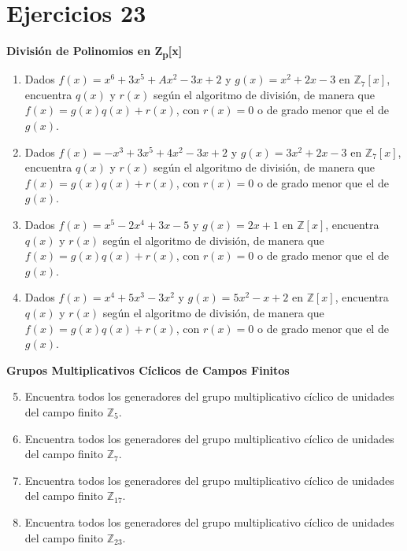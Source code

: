 \section*{Ejercicios 23}

\textbf{División de Polinomios en Z\textsubscript{p}[x]}
	
\begin{enumerate}
	\item Dados \(f(x) = x^6 + 3x^5 + Ax^2 - 3x + 2\) y \(g(x) = x^2 + 2x - 3\) en \(\mathbb{Z}_7[x]\), encuentra \(q(x)\) y \(r(x)\) según el algoritmo de división, de manera que \(f(x) = g(x)q(x) + r(x)\), con \(r(x) = 0\) o de grado menor que el de \(g(x)\).
		
	\item Dados \(f(x) = -x^3 + 3x^5 + 4x^2 - 3x + 2\) y \(g(x) = 3x^2 + 2x - 3\) en \(\mathbb{Z}_7[x]\), encuentra \(q(x)\) y \(r(x)\) según el algoritmo de división, de manera que \(f(x) = g(x)q(x) + r(x)\), con \(r(x) = 0\) o de grado menor que el de \(g(x)\).
		
	\item Dados \(f(x) = x^5 - 2x^4 + 3x - 5\) y \(g(x) = 2x + 1\) en \(\mathbb{Z}[x]\), encuentra \(q(x)\) y \(r(x)\) según el algoritmo de división, de manera que \(f(x) = g(x)q(x) + r(x)\), con \(r(x) = 0\) o de grado menor que el de \(g(x)\).
		
	\item Dados \(f(x) = x^4 + 5x^3 - 3x^2\) y \(g(x) = 5x^2 - x + 2\) en \(\mathbb{Z}[x]\), encuentra \(q(x)\) y \(r(x)\) según el algoritmo de división, de manera que \(f(x) = g(x)q(x) + r(x)\), con \(r(x) = 0\) o de grado menor que el de \(g(x)\).
\end{enumerate}
	
\textbf{Grupos Multiplicativos Cíclicos de Campos Finitos}
	
\begin{enumerate}
	\setcounter{enumi}{4}
	\item Encuentra todos los generadores del grupo multiplicativo cíclico de unidades del campo finito \(\mathbb{Z}_5\).
		
	\item Encuentra todos los generadores del grupo multiplicativo cíclico de unidades del campo finito \(\mathbb{Z}_7\).
		
	\item Encuentra todos los generadores del grupo multiplicativo cíclico de unidades del campo finito \(\mathbb{Z}_{17}\).
		
	\item Encuentra todos los generadores del grupo multiplicativo cíclico de unidades del campo finito \(\mathbb{Z}_{23}\).
\end{enumerate}
	
